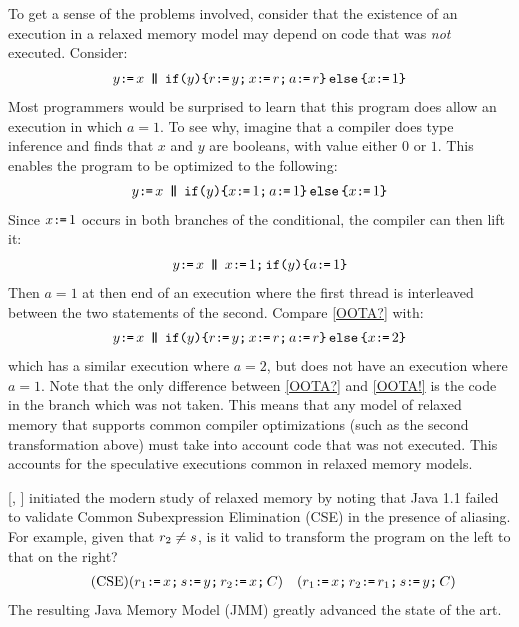 To get a sense of the problems involved,
consider that the existence of an execution in a relaxed memory model may
depend on code that was \emph{not} executed. Consider:
\begin{gather}
  \label{OOTA?}
    y\GETS x
  \PAR
    \IF{y}\THEN r\GETS y\SEMI x\GETS r\SEMI a\GETS r \ELSE x\GETS1 \FI
\end{gather}
Most programmers would be surprised to learn that this program does allow an
execution in which $a=1$. To see why, imagine that a compiler does type
inference and finds that $x$ and $y$ are booleans, with value either $0$ or
$1$.  This enables the program to be optimized to the following:
\begin{gather*}
    y\texttt{:}\mkern-1mu\texttt{=}\, x
  \,\mathbin{\texttt{\textbf{|}}\mkern-6mu\texttt{\textbf{|}}}\,
    \texttt{if}\allowbreak\texttt{(}y\texttt{)}\allowbreak\texttt{\{} x\texttt{:}\mkern-1mu\texttt{=}\, 1\texttt{;}\,\allowbreak a\texttt{:}\mkern-1mu\texttt{=}\, 1 \texttt{\}}\,\allowbreak\texttt{else}\allowbreak\,\texttt{\{} x\texttt{:}\mkern-1mu\texttt{=}\,1 \texttt{\}}
\end{gather*}
Since $x\texttt{:}\mkern-1mu\texttt{=}\,1$ occurs in both branches of the conditional, the compiler can
then lift it:
\begin{gather*}
    y\texttt{:}\mkern-1mu\texttt{=}\, x
  \,\mathbin{\texttt{\textbf{|}}\mkern-6mu\texttt{\textbf{|}}}\,
    x\texttt{:}\mkern-1mu\texttt{=}\,1\texttt{;}\,\allowbreak \texttt{if}\allowbreak\texttt{(}y\texttt{)}\allowbreak\texttt{\{} a\texttt{:}\mkern-1mu\texttt{=}\, 1 \texttt{\}}
\end{gather*}
Then $a=1$ at then end of an execution where the first thread is interleaved
between the two statements of the second.  Compare \eqref{OOTA?} with:
\begin{gather}
  \label{OOTA!}
    y\GETS x
  \PAR
    \IF{y}\THEN r\GETS y\SEMI x\GETS r\SEMI a\GETS r \ELSE x\GETS2 \FI
\end{gather}
which has a similar execution where $a=2$, but does not have an execution
where $a=1$. Note that the only difference between \ref{OOTA?} and
\ref{OOTA!} is the code in the branch which was not taken. This means that
any model of relaxed memory that supports common compiler optimizations (such
as the second transformation above) must take into account code that was not
executed. This accounts for the speculative executions common in relaxed
memory models.



\citeauthor{DBLP:conf/java/Pugh99} [\citeyear{DBLP:conf/java/Pugh99},
] initiated the modern study of relaxed memory by noting that
Java 1.1 failed to validate Common Subexpression Elimination (CSE) in the
presence of aliasing. For example, given that $r_2\neq s$, is it valid
to transform the program on the left to that on the right?
\begin{align*}
  \tag{CSE}\label{CSE1}
  ({r_1\texttt{:}\mkern-1mu\texttt{=}\, x \texttt{;}\,\allowbreak
  s\texttt{:}\mkern-1mu\texttt{=}\, y \texttt{;}\,\allowbreak  
  r_2\texttt{:}\mkern-1mu\texttt{=}\, x\texttt{;}\,\allowbreak C})
&&
  ({r_1\texttt{:}\mkern-1mu\texttt{=}\, x \texttt{;}\,\allowbreak     
    r_2\texttt{:}\mkern-1mu\texttt{=}\, r_1\texttt{;}\,\allowbreak
    s\texttt{:}\mkern-1mu\texttt{=}\, y \texttt{;}\,\allowbreak C})
\end{align*}
The resulting Java Memory Model (JMM) \cite{Manson:2005:JMM:1047659.1040336}
greatly advanced the state of the art.


